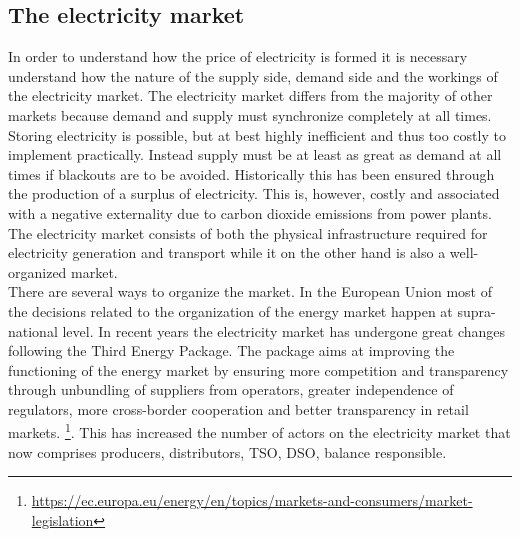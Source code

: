 \label{sec:theory}

\subsection{The electricity market}
\label{subsec:t_market}
In order to understand how the price of electricity is formed it is necessary understand how the nature of the supply side, demand side and the workings of the electricity market. The electricity market differs from the majority of other markets because demand and supply must synchronize completely at all times. Storing electricity is possible, but at best highly inefficient and thus too costly to implement practically. Instead supply must be at least as great as demand at all times if blackouts are to be avoided. Historically this has been ensured through the production of a surplus of electricity. This is, however, costly and associated with a  negative externality due to carbon dioxide emissions from power plants. \smallskip\\
The electricity market consists of both the physical infrastructure required for electricity generation and transport while it on the other hand is also a well-organized market.
\smallskip\\
There are several ways to organize the market. In the European Union most of the decisions related to the organization of the energy market happen at supra-national level. In recent years the electricity market has undergone great changes following the Third Energy Package. The package aims at improving the functioning of the energy market by ensuring more competition and transparency through unbundling of suppliers from operators, greater independence of regulators, more cross-border cooperation and better transparency in retail markets. \footnote{\url{https://ec.europa.eu/energy/en/topics/markets-and-consumers/market-legislation}}. This has increased the number of actors on the electricity market that now comprises producers, distributors, TSO, DSO, balance responsible.

